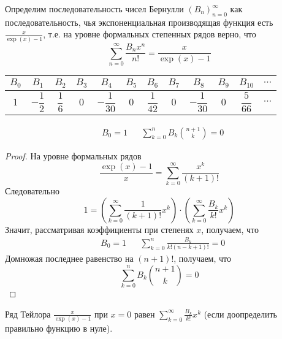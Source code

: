\documentclass[12pt,a4paper]{article}
\begin{document}
    \begin{definition}
        Определим последовательность чисел Бернулли $(B_n)_{n=0}^\infty$ как последовательность, чья экспоненциальная производящая функция есть $\frac{x}{\exp(x) - 1}$, т.е. на уровне формальных степенных рядов верно, что
        \[\sum_{n=0}^\infty \frac{B_n x^n}{n!} = \frac{x}{\exp(x) - 1}\]

        \begin{table}[H]
            \centering
            \begin{tabular}{c|c|c|c|c|c|c|c|c|c|c|c}
                $B_0$ & $B_1$ & $B_2$ & $B_3$ & $B_4$ & $B_5$ & $B_6$ & $B_7$ & $B_8$ & $B_9$ & $B_{10}$ & $\cdots$\\
                \hline
                \rule[-10pt]{0pt}{30pt} $1$ & $-\dfrac{1}{2}$ & $\dfrac{1}{6}$ & $0$ & $-\dfrac{1}{30}$ & $0$ & $\dfrac{1}{42}$ & $0$ & $-\dfrac{1}{30}$ & $0$ & $\dfrac{5}{66}$ & $\cdots$
            \end{tabular}
        \end{table}
    \end{definition}

    \begin{lemma}
        \begin{align*}
            &B_0 = 1&
            &\sum_{k=0}^n B_k \binom{n+1}{k} = 0
        \end{align*}
    \end{lemma}

    \begin{proof}
        На уровне формальных рядов
        \[\frac{\exp(x) - 1}{x} = \sum_{k=0}^\infty \frac{x^k}{(k+1)!}\]
        Следовательно
        \[1 = \left(\sum_{k=0}^\infty \frac{1}{(k+1)!} x^k\right) \cdot \left(\sum_{k=0}^\infty \frac{B_k}{k!}x^k\right)\]
        Значит, рассматривая коэффициенты при степенях $x$, получаем, что
        \begin{align*}
            &B_0 = 1&
            &\sum_{k=0}^n \frac{B_k}{k!(n-k+1)!} = 0
        \end{align*}
        Домножая последнее равенство на $(n+1)!$, получаем, что
        \[\sum_{k=0}^n B_k \binom{n+1}{k} = 0\]
    \end{proof}

    \begin{lemma}
        Ряд Тейлора $\frac{x}{\exp(x) - 1}$ при $x = 0$ равен $\sum_{k=0}^\infty \frac{B_k}{k!}x^k$ (если доопределить правильно функцию в нуле).
    \end{lemma}
\end{document}
